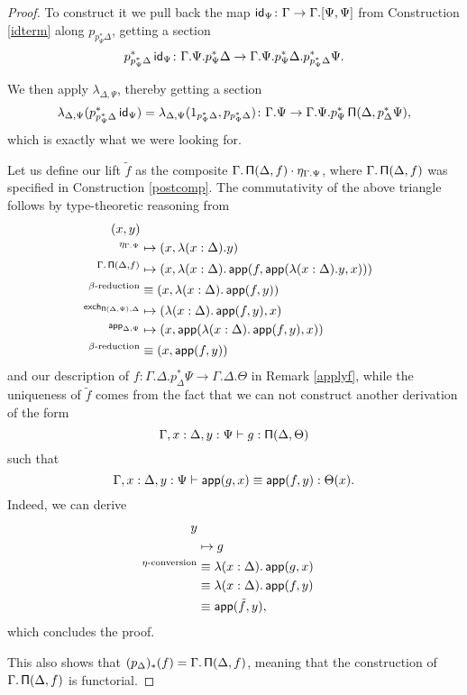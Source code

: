 \begin{proof}
\noindent
  To construct it we pull back the map
  $\operatorname{\mathsf{id}}_{\Psi}\colon\Gamma\rightarrow\Gamma.[\Psi,\Psi]$ from Construction
  \ref{idterm} along $p_{p^*_\Psi\Delta}$, getting a section
  \[p^*_{p^*_\Psi\Delta}\operatorname{\mathsf{id}}_{\Psi}\colon\Gamma.\Psi.p^*_\Psi\Delta\rightarrow\Gamma.\Psi.p^*_\Psi\Delta.p^*_{p^*_\Psi\Delta}\Psi.\]

\noindent
  We then apply $\lambda_{\Delta,\Psi}$, thereby getting a section
  \[\lambda_{\Delta,\Psi}(p^*_{p^*_\Psi\Delta}\operatorname{\mathsf{id}}_\Psi)
    =\lambda_{\Delta,\Psi}(1_{p^*_\Psi\Delta},p_{p^*_\Psi\Delta})
\colon\Gamma.\Psi\rightarrow\Gamma.\Psi.p^*_\Psi\operatorname{\mathsf{\Pi}}(\Delta,p^*_\Delta\Psi),\]
  which is exactly what we were looking for.

  \noindent
  Let us define our lift $\tilde{f}$ as the composite
  $\Gamma.\operatorname{\mathsf{\Pi}}(\Delta,f)\cdot\eta_{\Gamma.\Psi}$, where $\Gamma.\operatorname{\mathsf{\Pi}}(\Delta,f)$
  was specified in Construction \ref{postcomp}. The commutativity of the above
  triangle follows by type-theoretic reasoning from
  \begin{align*}
    (x,y) \\
    ^{\eta_{\Gamma.\Psi}}
    &\mapsto(x,\lambda(x:\Delta).y) \\
    ^{\Gamma.\operatorname{\mathsf{\Pi}}(\Delta,f)}
    &\mapsto(x,\lambda(x:\Delta).\operatorname{\mathsf{app}}(f,\operatorname{\mathsf{app}}(\lambda(x:\Delta).y,x))) \\
    ^{\beta\text{-reduction}}
    &\equiv(x,\lambda(x:\Delta).\operatorname{\mathsf{app}}(f,y)) \\
    ^{\operatorname{\mathsf{exch}}_{\operatorname{\mathsf{\Pi}}(\Delta,\Psi),\Delta}}
    &\mapsto(\lambda(x:\Delta).\operatorname{\mathsf{app}}(f,y),x) \\
    ^{\operatorname{\mathsf{app}}_{\Delta,\Psi}}
    &\mapsto(x,\operatorname{\mathsf{app}}(\lambda(x:\Delta).\operatorname{\mathsf{app}}(f,y),x)) \\
    ^{\beta\text{-reduction}}
    &\equiv(x,\operatorname{\mathsf{app}}(f,y))
  \end{align*}
  and our description of
  $f\colon\Gamma.\Delta.p^*_\Delta\Psi\rightarrow\Gamma.\Delta.\Theta$ in
  Remark \ref{applyf}, while the
  uniqueness of $\tilde{f}$ comes from the fact that we can not construct
  another derivation of the form
  \[\Gamma,x:\Delta,y:\Psi\vdash g:\operatorname{\mathsf{\Pi}}(\Delta,\Theta)\]
  such that
  \[\Gamma,x:\Delta,y:\Psi\vdash\operatorname{\mathsf{app}}(g,x)\equiv\operatorname{\mathsf{app}}(f,y):\Theta(x).\]
  Indeed, we can derive
  \begin{align*}
    y \\
        &\mapsto g \\
        ^{\eta\text{-conversion}}&\equiv\lambda(x:\Delta).\operatorname{\mathsf{app}}(g,x) \\
        &\equiv\lambda(x:\Delta).\operatorname{\mathsf{app}}(f,y) \\
        &\equiv\operatorname{\mathsf{app}}(\tilde{f},y),
  \end{align*}
  which concludes the proof.

  \noindent
  This also shows that $(p_{\Delta})_*(f)=\Gamma.\operatorname{\mathsf{\Pi}}(\Delta,f)$, meaning that
  the construction of $\Gamma.\operatorname{\mathsf{\Pi}}(\Delta,f)$ is functorial.
\end{proof}

